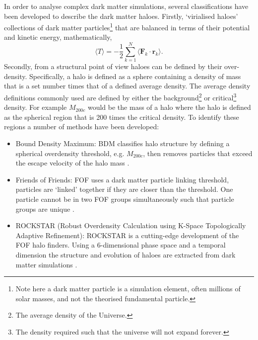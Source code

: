 In order to analyse complex dark matter simulations, several classifications have been developed to describe the dark matter haloes. Firstly, `virialised haloes' collections of dark matter particles\footnote{Note here a dark matter particle is a simulation element, often millions of solar masses, and not the theorised fundamental particle.} that are balanced in terms of their potential and kinetic energy, mathematically, 
\begin{equation}
    \langle T \rangle = -\frac{1}{2}\sum^{N}_{k=1}\langle \mathbf{F}_k \cdot \mathbf{r}_k \rangle.
\end{equation}
Secondly, from a structural point of view haloes can be defined by their over-density. 
Specifically, a halo is defined as a sphere containing a density of mass that is a set number times that of a defined average density. The average density definitions commonly used are defined by either the background\footnote{The average density of the Universe.} or critical\footnote{The density required such that the universe will not expand forever.} density.
For example $M_{200c}$ would be the mass of a halo where the halo is defined as the spherical region that is 200 times the critical density. To identify these regions a number of methods have been developed:

\begin{itemize}
    \item Bound Density Maximum: BDM classifies halo structure by defining a spherical overdensity threshold, e.g. $M_{200c}$, then removes particles that exceed the escape velocity of the halo mass \citep{Klypin1997Particle-MeshSimulations}.
    \item Friends of Friends: FOF uses a dark matter particle linking threshold, particles are `linked' together if they are closer than the threshold. One particle cannot be in two FOF groups simultaneously such that particle groups are unique \citep{Davis1985THEMATTER}.
    \item ROCKSTAR (Robust Overdensity Calculation using K-Space Topologically Adaptive Refinement): ROCKSTAR is a cutting-edge development of the FOF halo finders. Using a 6-dimensional phase space and a temporal dimension the structure and evolution of haloes are extracted from dark matter simulations \citep{Behroozi2011TheCores}.
\end{itemize}

